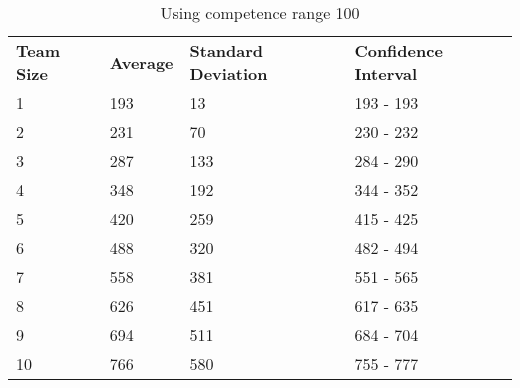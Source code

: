 \documentclass[12pt]{article}
\begin{document}
\begin{table}[!htb]
	\centering
	\caption{Using competence range 100}
	\begin{tabular}{llll}
		\textbf{Team Size} & \textbf{Average} & \textbf{Standard Deviation} & \textbf{Confidence Interval} \\
		1                  & 193              & 13                          & 193 - 193                    \\
		2                  & 231              & 70                          & 230 - 232                    \\
		3                  & 287              & 133                         & 284 - 290                    \\
		4                  & 348              & 192                         & 344 - 352                    \\
		5                  & 420              & 259                         & 415 - 425                    \\
		6                  & 488              & 320                         & 482 - 494                    \\
		7                  & 558              & 381                         & 551 - 565                    \\
		8                  & 626              & 451                         & 617 - 635                    \\
		9                  & 694              & 511                         & 684 - 704                    \\
		10                 & 766              & 580                         & 755 - 777                   
	\end{tabular}
\end{table}
\end{document}
